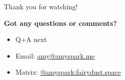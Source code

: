 \documentclass[aspectratio=169,handout,usepdftitle=false]{fireshonks}
\begin{document}
\begin{frame}{Thank you for watching!}
    \begin{center}
        {
            \large
            \textbf{Got any questions or comments?}
        }
        \begin{itemize}[<*>]
            \item Q+A next
            \item Email: \href{mailto:amy@amyspark.me?subject="FireShonks 2023"}{amy@amyspark.me}
            \item Matrix: \href{https://matrix.to/\#/@amyspark:fairydust.space}{@amyspark:fairydust.space}
        \end{itemize}
    \end{center}
\end{frame}
\begin{frame}{\bibname}
    \printbibliography[heading=none]
\end{frame}
\end{document}
